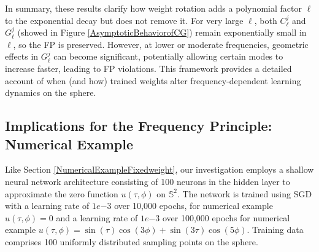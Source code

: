 \documentclass[review,onefignum,onetabnum,onealgnum]{siamart250106}
\numberwithin{theorem}{section}
\begin{document}
In summary, these results clarify how weight rotation adds a polynomial factor \(\ell\) to the exponential decay but does not remove it.  For very large \(\ell\), both \(C_{\ell}^j\) and \(G_{\ell}^j\) (showed in Figure \ref{AsymptoticBehaviorofCG}) remain exponentially small in \(\ell\), so the FP is preserved.  However, at lower or moderate frequencies, geometric effects in \(G_{\ell}^j\) can become significant, potentially allowing certain modes to increase faster, leading to FP violations.  This framework provides a detailed account of when (and how) trained weights alter frequency-dependent learning dynamics on the sphere.
































\subsection{Implications for the Frequency Principle: Numerical Example}
Like Section \ref{NumericalExampleFixedweight}, our investigation employs a shallow neural network architecture consisting of 100 neurons in the hidden layer to approximate the zero function $u(\tau,\phi)$ on $\mathbb{S}^2$. The network is trained using SGD with a learning rate of $1e{-3}$ over 10,000 epochs, for numerical example $u(\tau,\phi)=0$ and a learning rate of $1e{-3}$ over 100,000 epochs for numerical example $u(\tau,\phi) = \sin(\tau)\cos(3\phi) + \sin(3\tau)\cos(5\phi)$. Training data comprises 100 uniformly distributed sampling points on the sphere. 
\end{document}
